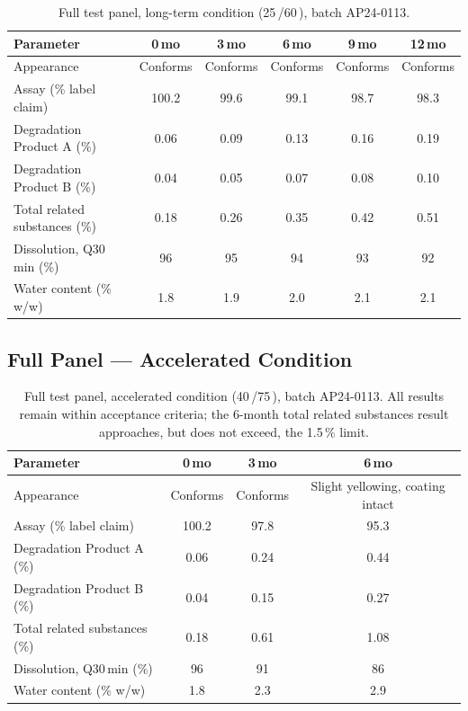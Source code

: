 \begin{table}[htbp]
\centering
\small
\begin{tabularx}{\textwidth}{@{}X c c c c c@{}}
\toprule
\textbf{Parameter} & \textbf{0\,mo} & \textbf{3\,mo} & \textbf{6\,mo} & \textbf{9\,mo} & \textbf{12\,mo} \\
\midrule
Appearance & Conforms & Conforms & Conforms & Conforms & Conforms \\
Assay (\% label claim) & 100.2 & 99.6 & 99.1 & 98.7 & 98.3 \\
Degradation Product A (\%) & 0.06 & 0.09 & 0.13 & 0.16 & 0.19 \\
Degradation Product B (\%) & 0.04 & 0.05 & 0.07 & 0.08 & 0.10 \\
Total related substances (\%) & 0.18 & 0.26 & 0.35 & 0.42 & 0.51 \\
Dissolution, Q30\,min (\%) & 96 & 95 & 94 & 93 & 92 \\
Water content (\% w/w) & 1.8 & 1.9 & 2.0 & 2.1 & 2.1 \\
\bottomrule
\end{tabularx}
\caption{Full test panel, long-term condition (25\,\degC/60\,\RH), batch AP24-0113.}
\label{tab:longterm}
\end{table}

\subsection{Full Panel --- Accelerated Condition}
\begin{table}[htbp]
\centering
\small
\begin{tabularx}{\textwidth}{@{}X c c c@{}}
\toprule
\textbf{Parameter} & \textbf{0\,mo} & \textbf{3\,mo} & \textbf{6\,mo} \\
\midrule
Appearance & Conforms & Conforms & Slight yellowing, coating intact \\
Assay (\% label claim) & 100.2 & 97.8 & 95.3 \\
Degradation Product A (\%) & 0.06 & 0.24 & 0.44 \\
Degradation Product B (\%) & 0.04 & 0.15 & 0.27 \\
Total related substances (\%) & 0.18 & 0.61 & 1.08 \\
Dissolution, Q30\,min (\%) & 96 & 91 & 86 \\
Water content (\% w/w) & 1.8 & 2.3 & 2.9 \\
\bottomrule
\end{tabularx}
\caption{Full test panel, accelerated condition (40\,\degC/75\,\RH), batch AP24-0113. All
results remain within acceptance criteria; the 6-month total related substances result
approaches, but does not exceed, the 1.5\,\% limit.}
\label{tab:accel}
\end{table}

